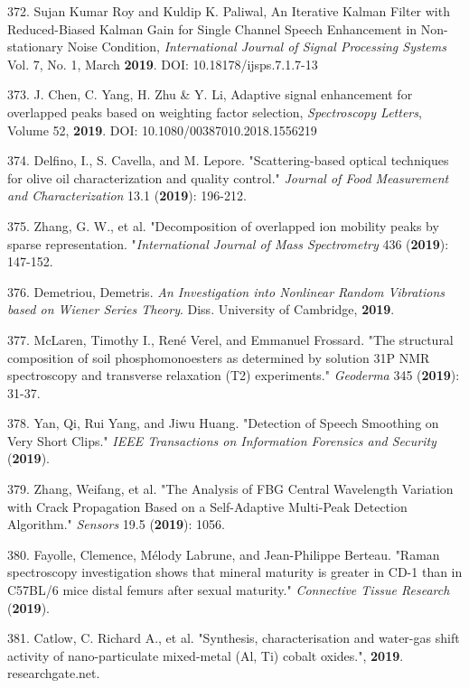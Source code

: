 372. Sujan Kumar Roy and Kuldip K. Paliwal, An Iterative Kalman Filter with Reduced-Biased Kalman Gain for Single Channel Speech Enhancement in Non-stationary Noise Condition, \textit{International Journal of Signal Processing Systems} Vol. 7, No. 1, March \textbf{2019}. DOI: 10.18178/ijsps.7.1.7-13

373. J. Chen, C. Yang, H. Zhu \& Y. Li, Adaptive signal enhancement for overlapped peaks based on weighting factor selection, \textit{Spectroscopy Letters}, Volume 52, \textbf{2019}. DOI: 10.1080/00387010.2018.1556219

374. Delfino, I., S. Cavella, and M. Lepore. "Scattering-based optical techniques for olive oil characterization and quality control." \textit{Journal of Food Measurement and Characterization} 13.1 (\textbf{2019}): 196-212.

375. Zhang, G. W., et al. "Decomposition of overlapped ion mobility peaks by sparse representation. "\textit{International Journal of Mass Spectrometry} 436 (\textbf{2019}): 147-152.

376. Demetriou, Demetris. \textit{An Investigation into Nonlinear Random Vibrations based on Wiener Series Theory}. Diss. University of Cambridge, \textbf{2019}.

377. McLaren, Timothy I., Ren\'{e} Verel, and Emmanuel Frossard. "The structural composition of soil phosphomonoesters as determined by solution 31P NMR spectroscopy and transverse relaxation (T2) experiments." \textit{Geoderma} 345 (\textbf{2019}): 31-37.

378. Yan, Qi, Rui Yang, and Jiwu Huang. "Detection of Speech Smoothing on Very Short Clips." \textit{IEEE Transactions on Information Forensics and Security} (\textbf{2019}).

379. Zhang, Weifang, et al. "The Analysis of FBG Central Wavelength Variation with Crack Propagation Based on a Self-Adaptive Multi-Peak Detection Algorithm." \textit{Sensors} 19.5 (\textbf{2019}): 1056.

380. Fayolle, Clemence, M\'{e}lody Labrune, and Jean-Philippe Berteau. "Raman spectroscopy investigation shows that mineral maturity is greater in CD-1 than in C57BL/6 mice distal femurs after sexual maturity." \textit{Connective Tissue Research} (\textbf{2019}).

381. Catlow, C. Richard A., et al. "Synthesis, characterisation and water-gas shift activity of nano-particulate mixed-metal (Al, Ti) cobalt oxides.", \textbf{2019}. \textcolor{color-24}{researchgate.net.}

